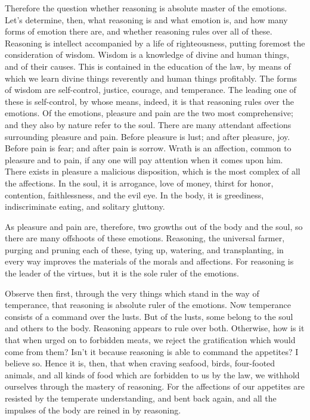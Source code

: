  Therefore the question whether reasoning is absolute
master of the emotions.  Let's determine, then, what
reasoning is and what emotion is, and how many forms of emotion there
are, and whether reasoning rules over all of these. 
Reasoning is intellect accompanied by a life of righteousness, putting
foremost the consideration of wisdom.  Wisdom is a
knowledge of divine and human things, and of their causes. 
This is contained in the education of the law, by means of which we
learn divine things reverently and human things profitably.
 The forms of wisdom are self-control, justice, courage,
and temperance.  The leading one of these is self-control,
by whose means, indeed, it is that reasoning rules over the emotions.
 Of the emotions, pleasure and pain are the two most
comprehensive; and they also by nature refer to the soul. 
There are many attendant affections surrounding pleasure and pain.
 Before pleasure is lust; and after pleasure, joy.
 Before pain is fear; and after pain is sorrow.
 Wrath is an affection, common to pleasure and to pain, if
any one will pay attention when it comes upon him.  There
exists in pleasure a malicious disposition, which is the most complex of
all the affections.  In the soul, it is arrogance, love of
money, thirst for honor, contention, faithlessness, and the evil eye.
 In the body, it is greediness, indiscriminate eating, and
solitary gluttony.

 As pleasure and pain are, therefore, two growths out of
the body and the soul, so there are many offshoots of these emotions.
 Reasoning, the universal farmer, purging and pruning each
of these, tying up, watering, and transplanting, in every way improves
the materials of the morals and affections.  For reasoning
is the leader of the virtues, but it is the sole ruler of the emotions.

Observe then first, through the very things which stand in the way of
temperance, that reasoning is absolute ruler of the emotions.
 Now temperance consists of a command over the lusts.
 But of the lusts, some belong to the soul and others to
the body. Reasoning appears to rule over both.  Otherwise,
how is it that when urged on to forbidden meats, we reject the
gratification which would come from them? Isn't it because reasoning is
able to command the appetites? I believe so.  Hence it is,
then, that when craving seafood, birds, four-footed animals, and all
kinds of food which are forbidden to us by the law, we withhold
ourselves through the mastery of reasoning.  For the
affections of our appetites are resisted by the temperate understanding,
and bent back again, and all the impulses of the body are reined in by
reasoning.

